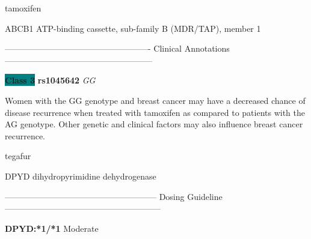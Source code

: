 \documentclass{resume} %
\begin{document}
\begin{rSection}{ tamoxifen }
\begin{rSubsection}{ ABCB1 }{ ATP-binding cassette, sub-family B (MDR/TAP), member 1 }{}{}
\item[]

\item[] ---------------------------------------------------- Clinical Annotations -----------------------------------------------------\newline
\item \textbf{\colorbox{teal} {Class 3}} \textbf{ rs1045642 } \textit{ GG }
\item[] Women with the GG genotype and breast cancer may have a decreased chance of disease recurrence when treated with tamoxifen as compared to patients with the AG genotype. Other genetic and clinical factors may also influence breast cancer recurrence.
\end{rSubsection}

\end{rSection}\begin{rSection}{ tegafur }
\item[]

\begin{rSubsection}{ DPYD }{ dihydropyrimidine dehydrogenase }{}{}
\item[]
\item[] ------------------------------------------------------ Dosing Guideline --------------------------------------------------------\newline
\item[]
\item[] \textbf{ DPYD:*1/*1 } Moderate


\end{rSubsection}
\end{rSection}
\end{document}
